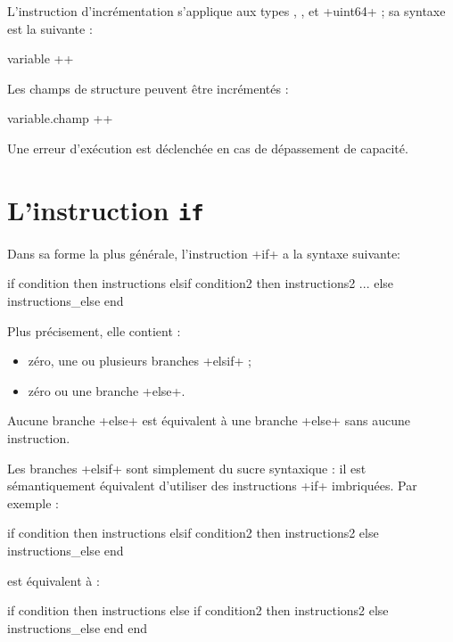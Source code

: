 
L'instruction d'incrémentation s'applique aux types  ,  ,  et \ggs+uint64+ ; sa syntaxe est la suivante :

\begin{galgas}
variable ++
\end{galgas}

Les champs de structure peuvent être incrémentés :
\begin{galgas}
variable.champ ++
\end{galgas}

Une erreur d'exécution est déclenchée en cas de dépassement de capacité.









\section{L'instruction \texttt{if}}


Dans sa forme la plus générale, l'instruction \ggs+if+ a la syntaxe suivante:

\begin{galgas}
if condition then
  instructions
elsif condition2 then
  instructions2
...
else
  instructions_else
end
\end{galgas}


Plus précisement, elle contient :
\begin{itemize}
\item zéro, une ou plusieurs branches \ggs+elsif+ ;
\item zéro ou une branche \ggs+else+.
\end{itemize}


Aucune branche \ggs+else+ est équivalent à une branche \ggs+else+ sans aucune instruction.


Les branches \ggs+elsif+ sont simplement du sucre syntaxique : il est sémantiquement équivalent d'utiliser des instructions \ggs+if+ imbriquées. Par exemple :
\begin{galgas}
if condition then
  instructions
elsif condition2 then
  instructions2
else
  instructions_else
end
\end{galgas}

est équivalent à :
\begin{galgas}
if condition then
  instructions
else
  if condition2 then
    instructions2
  else
    instructions_else
  end
end
\end{galgas}


